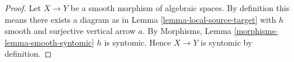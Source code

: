 \documentclass[10pt,a4paper]{amsart}
\theoremstyle{plain}
\theoremstyle{definition}
\theoremstyle{remark}
\numberwithin{equation}{subsection}
\begin{document}
\begin{proof}
Let $X \to Y$ be a smooth morphism of algebraic spaces. By
definition this means there exists a diagram as in
Lemma \ref{lemma-local-source-target}
with $h$ smooth and surjective vertical arrow $a$. By
Morphisms, Lemma \ref{morphisms-lemma-smooth-syntomic}
$h$ is syntomic. Hence $X \to Y$ is syntomic by definition.
\end{proof}
\end{document}

